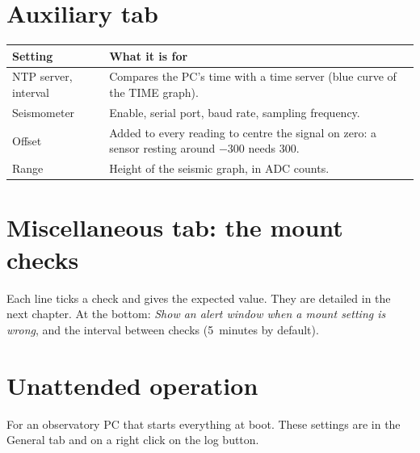 \needspace{0.6\textheight}
\section{Auxiliary tab}


\begin{center}
\begin{tabularx}{\textwidth}{lX}
\toprule
\textbf{Setting} & \textbf{What it is for} \\
\midrule
NTP server, interval & Compares the PC's time with a time server (blue curve
of the TIME graph). \\
Seismometer & Enable, serial port, baud rate, sampling frequency. \\
Offset & Added to every reading to centre the signal on zero: a sensor resting
around $-300$ needs 300. \\
Range & Height of the seismic graph, in ADC counts. \\
\bottomrule
\end{tabularx}
\end{center}

\needspace{0.6\textheight}
\section{Miscellaneous tab: the mount checks}


Each line ticks a check and gives the expected value. They are detailed in the
next chapter. At the bottom: \emph{Show an alert window when a mount setting is
wrong}, and the interval between checks (5~minutes by default).

\section{Unattended operation}
\label{sec:unattended}

For an observatory PC that starts everything at boot. These settings are in the
General tab and on a right click on the log button.

